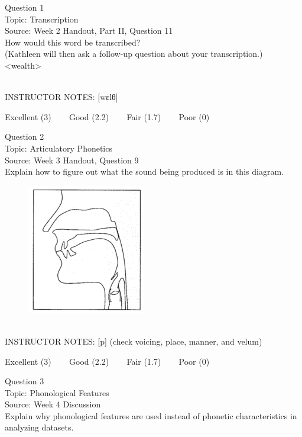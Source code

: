 \documentclass[12pt]{article}
\begin{document}
{\large Question 1}\\

Topic: Transcription\\
Source: Week 2 Handout, Part II, Question 11\\

How would this word be transcribed?\\ (Kathleen will then ask a follow-up question about your transcription.)\\

<wealth>


~\\
INSTRUCTOR NOTES: [wɛlθ]


\vfill
Excellent (3) ~~~ Good (2.2) ~~~ Fair (1.7) ~~~ Poor (0)
\newpage

{\large Question 2}\\

Topic: Articulatory Phonetics\\
Source: Week 3 Handout, Question 9\\

Explain how to figure out what the sound being produced is in this diagram.\\

\begin{figure}[H]
\includegraphics{../images/sagittal_p.png}
\end{figure}

~\\
INSTRUCTOR NOTES: [p] (check voicing, place, manner, and velum)


\vfill
Excellent (3) ~~~ Good (2.2) ~~~ Fair (1.7) ~~~ Poor (0)
\newpage

{\large Question 3}\\

Topic: Phonological Features\\
Source: Week 4 Discussion\\

Explain why phonological features are used instead of phonetic characteristics in analyzing datasets.\\
\end{document}

